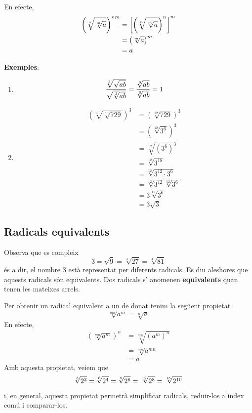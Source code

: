 En efecte, 
\begin{align*}
\left( \sqrt[n]{\sqrt[m]{a}}\right) ^{nm} &=\left[ \left( \sqrt[n]{\sqrt[m]{%
a}}\right) ^{n}\right] ^{m} \\
&=\left( \sqrt[m]{a}\right) ^{m} \\
&=a
\end{align*}

\textbf{Exemples}:

\begin{enumerate}
\item 
\begin{equation*}
\frac{\sqrt[3]{\sqrt{ab}}}{\sqrt{\sqrt[3]{ab}}}=\frac{\sqrt[6]{ab}}{\sqrt[6]{%
ab}}=1
\end{equation*}

\item 
\begin{align*}
\left( \sqrt[4]{\sqrt[3]{729}}\right) ^{3} &=\left( \sqrt[12]{729}\right)
^{3} \\
&=\left( \sqrt[12]{3^{6}}\right) ^{3} \\
&=\sqrt[12]{\left( 3^{6}\right) ^{3}} \\
&=\sqrt[12]{3^{18}} \\
&=\sqrt[12]{3^{12}\cdot 3^{6}} \\
&=\sqrt[12]{3^{12}}\sqrt[12]{3^{6}} \\
&=3\sqrt[12]{3^{6}} \\
&=3\sqrt{3}
\end{align*}
\end{enumerate}

\subsection{Radicals equivalents}

Observa que es compleix%
\begin{equation*}
3=\sqrt{9}=\sqrt[3]{27}=\sqrt[4]{81}
\end{equation*}%
és a dir, el nombre $3$ està representat per diferents radicals.
Es diu aleshores que aquests radicals són equivalents. Dos radicals s’
anomenen \textbf{equivalents} quan tenen les mateixes arrels.

Per obtenir un radical equivalent a un de donat tenim la següent propietat%
\begin{equation*}
\sqrt[mn]{a^{m}}=\sqrt[n]{a}
\end{equation*}%
En efecte,%
\begin{align*}
\left( \sqrt[mn]{a^{m}}\right) ^{n} &=\sqrt[mn]{\left( a^{m}\right) ^{n}} \\
&=\sqrt[mn]{a^{mn}} \\
&=a
\end{align*}%
Amb aquesta propietat, veiem que 
\begin{equation*}
\sqrt[3]{2^{2}}=\sqrt[6]{2^{4}}=\sqrt[9]{2^{6}}=\sqrt[12]{2^{8}}=\sqrt[15]{%
2^{10}}
\end{equation*}%
i, en general, aquesta propietat permetrà simplificar radicals,
reduir-los a índex comú i comparar-los.

